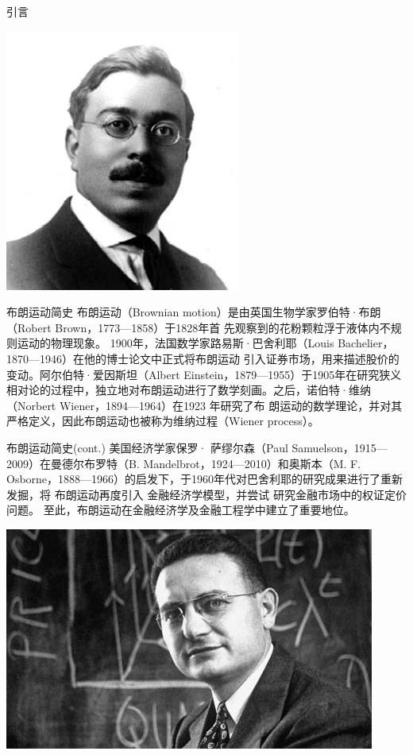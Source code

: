 \documentclass[t]{beamer}
\begin{document}
\begin{frame}{引言}
\begin{center}
\includegraphics[height=.35\textheight]{fig/wiener.jpeg}
    \end{center}
  \end{frame}

\begin{frame}{布朗运动简史}
  布朗运动（Brownian motion）是由英国生物学家罗伯特·布朗（Robert Brown，1773---1858）于1828年首
先观察到的花粉颗粒浮于液体内不规则运动的物理现象。
1900年，法国数学家路易斯·巴舍利耶（Louis Bachelier，1870---1946）在他的博士论文中正式将布朗运动
引入证券市场，用来描述股价的变动。阿尔伯特·爱因斯坦（Albert Einstein，1879---1955）于1905年在研究狭义相对论的过程中，独立地对布朗运动进行了数学刻画。之后，诺伯特·维纳（Norbert Wiener，1894---1964）在1923 年研究了布
朗运动的数学理论，并对其严格定义，因此布朗运动也被称为维纳过程（Wiener process）。
\end{frame}

\begin{frame}{布朗运动简史(cont.)}
  美国经济学家保罗· 萨缪尔森（Paul Samuelson，1915---2009）在曼德尔布罗特（B. Mandelbrot，1924---2010）和奥斯本（M. F. Osborne，1888---1966）的启发下，于1960年代对巴舍利耶的研究成果进行了重新发掘，将
布朗运动再度引入
金融经济学模型，并尝试
研究金融市场中的权证定价问题。
至此，布朗运动在金融经济学及金融工程学中建立了重要地位。
\begin{center}
  \includegraphics[scale=.5]{fig/Samuelson.jpg}
\end{center}
\end{frame}
\end{document}
